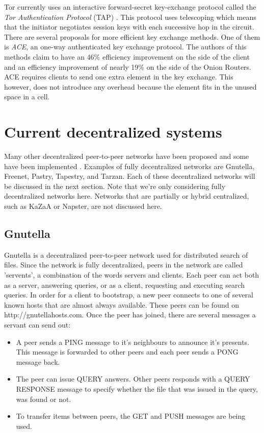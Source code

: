 \documentclass{article}
\begin{document}
		Tor currently uses an interactive forward-secret key-exchange protocol called the \emph{Tor Authentication Protocol} (TAP) \cite{backes2012ace}. This protocol uses telescoping which means that the initiator negotiates session keys with each successive hop in the circuit. There are several proposals for more efficient key exchange methods. One of them is \emph{ACE}, an one-way authenticated key exchange protocol. The authors of this methods claim to have an 46\% efficiency improvement on the side of the client and an efficiency improvement of nearly 19\% on the side of the Onion Routers. ACE requires clients to send one extra element in the key exchange. This however, does not introduce any overhead because the element fits in the unused space in a cell.

\section{Current decentralized systems}
	\label{sec:decentralized}
	
	Many other decentralized peer-to-peer networks have been proposed and some have been implemented \cite{mislove2004ap3, rennhard2002introducing, panchenko2006nisan, rowstron2001pastry, nambiar2006salsa, freedman2002tarzan, ripeanu2001peer, androutsellis2004survey}. Examples of fully decentralized networks are Gnutella, Freenet, Pastry, Tapestry, and Tarzan. Each of these decentralized networks will be discussed in the next section. Note that we're only considering fully decentralized networks here. Networks that are partially or hybrid centralized, such as KaZaA or Napster, are not discussed here.

	\subsection{Gnutella} %
		Gnutella is a decentralized peer-to-peer network used for distributed search of files. Since the network is fully decentralized, peers in the network are called 'servents', a combination of the words servers and clients. Each peer can act both as a server, answering queries, or as a client, requesting and executing search queries. In order for a client to bootstrap, a new peer connects to one of several known hosts that are almost always available. These peers can be found on http://gnutellahosts.com. Once the peer has joined, there are several messages a servant can send out:
	
		\begin{itemize}
			\item A peer sends a PING message to it's neighbours to announce it's presents. This message is forwarded to other peers and each peer sends a PONG message back.
			\item The peer can issue QUERY answers. Other peers responds with a QUERY RESPONSE message to specify whether the file that was issued in the query, was found or not.
			\item To transfer items between peers, the GET and PUSH messages are being used.
		\end{itemize}
		
\end{document}
